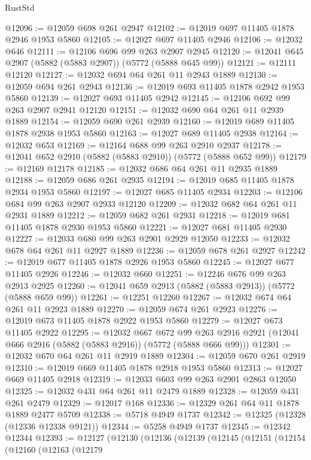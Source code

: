 \begin{lexlean}{RustStd}
\begin{coremodule}
{\begin{coremodule}
{{{{{{{{{{{{{{{{{{{{{{{{{{{{{@12096 := @12059 @698 @261 @2947
@12102 := @12019 @697 @11405 @1878 @2946 @1953 @5860
@12105 := @12027 @697 @11405 @2946
@12106 := @12032 @646
@12111 := @12106 @696 @99 @263 @2907 @2945
@12120 := @12041 @645 @2907 (@5882 (@5883 @2907)) (@5772 (@5888 @645 @99))
@12121 := @12111 @12120
@12127 := @12032 @694 @64 @261 @11 @2943 @1889
@12130 := @12059 @694 @261 @2943
@12136 := @12019 @693 @11405 @1878 @2942 @1953 @5860
@12139 := @12027 @693 @11405 @2942
@12145 := @12106 @692 @99 @263 @2907 @2941 @12120
@12151 := @12032 @690 @64 @261 @11 @2939 @1889
@12154 := @12059 @690 @261 @2939
@12160 := @12019 @689 @11405 @1878 @2938 @1953 @5860
@12163 := @12027 @689 @11405 @2938
@12164 := @12032 @653
@12169 := @12164 @688 @99 @263 @2910 @2937
@12178 := @12041 @652 @2910 (@5882 (@5883 @2910)) (@5772 (@5888 @652 @99))
@12179 := @12169 @12178
@12185 := @12032 @686 @64 @261 @11 @2935 @1889
@12188 := @12059 @686 @261 @2935
@12194 := @12019 @685 @11405 @1878 @2934 @1953 @5860
@12197 := @12027 @685 @11405 @2934
@12203 := @12106 @684 @99 @263 @2907 @2933 @12120
@12209 := @12032 @682 @64 @261 @11 @2931 @1889
@12212 := @12059 @682 @261 @2931
@12218 := @12019 @681 @11405 @1878 @2930 @1953 @5860
@12221 := @12027 @681 @11405 @2930
@12227 := @12033 @680 @99 @263 @2901 @2929 @12050
@12233 := @12032 @678 @64 @261 @11 @2927 @1889
@12236 := @12059 @678 @261 @2927
@12242 := @12019 @677 @11405 @1878 @2926 @1953 @5860
@12245 := @12027 @677 @11405 @2926
@12246 := @12032 @660
@12251 := @12246 @676 @99 @263 @2913 @2925
@12260 := @12041 @659 @2913 (@5882 (@5883 @2913)) (@5772 (@5888 @659 @99))
@12261 := @12251 @12260
@12267 := @12032 @674 @64 @261 @11 @2923 @1889
@12270 := @12059 @674 @261 @2923
@12276 := @12019 @673 @11405 @1878 @2922 @1953 @5860
@12279 := @12027 @673 @11405 @2922
@12295 := @12032
    @667
    @672
    @99
    @263
    @2916
    @2921
    (@12041 @666 @2916 (@5882 (@5883 @2916)) (@5772 (@5888 @666 @99)))
@12301 := @12032 @670 @64 @261 @11 @2919 @1889
@12304 := @12059 @670 @261 @2919
@12310 := @12019 @669 @11405 @1878 @2918 @1953 @5860
@12313 := @12027 @669 @11405 @2918
@12319 := @12033 @603 @99 @263 @2901 @2863 @12050
@12325 := @12032 @431 @64 @261 @11 @2479 @1889
@12328 := @12059 @431 @261 @2479
@12329 := @12017 @168
@12336 := @12329 @261 @64 @11 @1878 @1889 @2477 @5709
@12338 := @5718 @4949 @1737
@12342 := @12325 (@12328 (@12336 @12338 @9121))
@12344 := @5258 @4949 @1737
@12345 := @12342 @12344
@12393 := @12127
    (@12130
      (@12136
        (@12139
          (@12145
            (@12151
              (@12154
                (@12160
                  (@12163
                    (@12179
}}}}}}}}}}}}}}}}}}}}}}}}}}}}}
\end{coremodule}}
\end{coremodule}
\end{lexlean}
